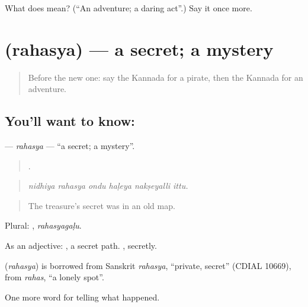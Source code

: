 \begin{tcolorbox}[breakable,colback=teal!4,colframe=teal!35!black,title={Before you move on}]
What does  mean? (\textquotedblleft{}An adventure; a daring act\textquotedblright{}.) Say it once more.
\end{tcolorbox}
\section[\texorpdfstring{\kn{ರಹಸ್ಯ} (rahasya)}{ರಹಸ್ಯ (rahasya)}]{ (rahasya) — a secret; a mystery}

\label{lesson:KA-C348-rahasya}



\begin{quote}
Before the new one: say the Kannada for a pirate, then the Kannada for an adventure.
\end{quote}

\subsection*{You'll want to know: }
\textbf{} — \emph{rahasya} — \textquotedblleft{}a secret; a mystery\textquotedblright{}.

\begin{quote}
     .
\end{quote}

\begin{quote}
\emph{nidhiya rahasya ondu haḷeya nakṣeyalli ittu.}
\end{quote}

\begin{quote}
The treasure's secret was in an old map.
\end{quote}

Plural: , \emph{rahasyagaḷu}.

As an adjective:  , a secret path. , secretly.

\begin{cousinweb}
\textbf{} (\emph{rahasya}) is borrowed from Sanskrit \emph{rahasya}, \textquotedblleft{}private, secret\textquotedblright{} (CDIAL 10669), from \emph{rahas}, \textquotedblleft{}a lonely spot\textquotedblright{}.
\end{cousinweb}

\begin{grammarlens}[title={What you've built}]
One more word for telling what happened.
\end{grammarlens}

